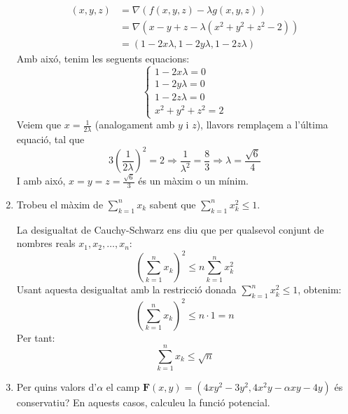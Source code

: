 \documentclass[a4paper, 12pt]{article}
\begin{document}
\begin{exercici}
\begin{enumerate}[label=\alph*)]
\begin{solucio}
\begin{displaymath}
                    \begin{split}
                        \left(x,y,z\right) &= \nabla\left(f(x,y,z)-\lambda g(x,y,z)\right)\\
                        &= \nabla\left(x-y+z-\lambda\left(x^2+y^2+z^2-2\right)\right)\\
                        &= \left(1-2x\lambda,1-2y\lambda,1-2z\lambda\right)
                    \end{split}
                \end{displaymath}
                Amb aixó, tenim les seguents equacions:
                \begin{displaymath}
                    \begin{cases}
                        1-2x\lambda = 0\\
                        1-2y\lambda = 0\\
                        1-2z\lambda = 0\\
                        x^2+y^2+z^2 = 2
                    \end{cases}
                \end{displaymath}
                Veiem que $x = \frac{1}{2\lambda}$ (analogament amb $y\text{ i }z$), llavors
                remplaçem a l'última equació, tal que
                $$3\left(\frac{1}{2\lambda}\right)^2 = 2 \Rightarrow \frac{1}{\lambda^2} = \frac{8}{3} \Rightarrow \lambda = \frac{\sqrt{6}}{4}$$
                I amb aixó, $x = y = z = \frac{\sqrt{6}}{3}$ és un màxim o un mínim.
            \end{solucio}
            \item Trobeu el màxim de \( \sum_{k=1}^n x_k \) sabent que \( \sum_{k=1}^n x_k^2 \leq 1 \).\\
            \begin{solucio}
                La desigualtat de Cauchy-Schwarz ens diu que per qualsevol conjunt de nombres reals \( x_1, x_2, \ldots, x_n \):
                \[
                \left( \sum_{k=1}^n x_k \right)^2 \leq n \sum_{k=1}^n x_k^2
                \]
                Usant aquesta desigualtat amb la restricció donada \( \sum_{k=1}^n x_k^2 \leq 1 \), obtenim:
                \[
                \left( \sum_{k=1}^n x_k \right)^2 \leq n \cdot 1 = n
                \]
                Per tant:
                \[
                \sum_{k=1}^n x_k \leq \sqrt{n}
                \]
            \end{solucio}
            \item Per quins valors d'$\alpha$ el camp \( \mathbf{F}(x, y) = (4xy^2 - 3y^2, 4x^2y - \alpha xy - 4y) \) és conservatiu? En aquests casos, calculeu la funció potencial.\\

\end{enumerate}
\end{exercici}
\end{document}

